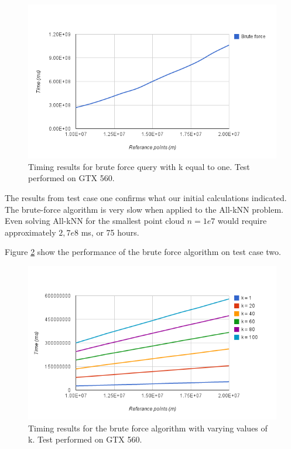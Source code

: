 \begin{figure}[ht!]
    \centering
    \includegraphics[width=120mm]{../gfx/brute-force-query.png}
    \caption{Timing results for brute force query with k equal to one. Test performed on GTX 560.}
    \label{fig:brute-force-query}
\end{figure}

The results from test case one confirms what our initial calculations indicated. The brute-force algorithm is very slow when applied to the All-kNN problem. Even solving All-kNN for the smallest point cloud $n=1e7$ would require approximately $2,7e8$ ms, or 75 hours.

Figure \ref{fig:brute-force-variable-k} show the performance of the brute force algorithm on test case two.

\begin{figure}[ht!]
    \centering
    \includegraphics[width=120mm]{../gfx/brute-force-variable-k.png}
    \caption{Timing results for the brute force algorithm with varying values of k. Test performed on GTX 560.}
    \label{fig:brute-force-variable-k}
\end{figure}

